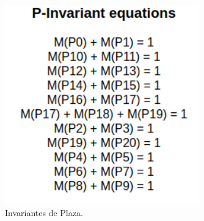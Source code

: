 \documentclass{article}
\begin{document}
		\begin{figure}[H]
			\centering
			\includegraphics[width=0.75\textwidth]{Invariantes_P}
			\caption{Invariantes de Plaza.}
			\label{fig:mesh6}
		\end{figure}
		
\end{document}
